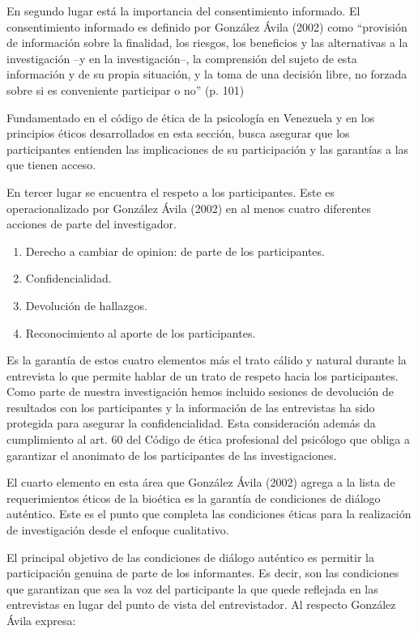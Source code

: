 En segundo lugar está la importancia del consentimiento informado.
El consentimiento informado es definido por González Ávila (2002) como
“provisión de información sobre la finalidad, los riesgos, los beneficios y
las alternativas a la investigación –y en la investigación–, la comprensión
del sujeto de esta información y de su propia situación, y la toma de una
decisión libre, no forzada sobre si es conveniente participar o no” (p. 101)

Fundamentado en el código de ética de la psicología en Venezuela y en los
principios éticos desarrollados en esta sección, busca asegurar que los
participantes entienden las implicaciones de su participación y las garantías
a las que tienen acceso.

En tercer lugar se encuentra el respeto a los participantes.
Este es operacionalizado por González Ávila (2002) en al menos cuatro
diferentes acciones de parte del investigador.

\begin{enumerate}
    \item Derecho a cambiar de opinion: de parte de los participantes.
    \item Confidencialidad.
    \item Devolución de hallazgos.
    \item Reconocimiento al aporte de los participantes.
\end{enumerate}

Es la garantía de estos cuatro elementos más el trato cálido y natural
durante la entrevista lo que permite hablar de un trato de respeto hacia los
participantes.
Como parte de nuestra investigación hemos incluido sesiones de devolución de
resultados con los participantes y la información de las entrevistas ha sido
protegida para asegurar la confidencialidad.
Esta consideración además da cumplimiento al art. 60 del Código de ética
profesional del psicólogo que obliga a garantizar el anonimato de los
participantes de las investigaciones.

El cuarto elemento en esta área que González Ávila
(2002) agrega a la lista de requerimientos éticos de la bioética es la
garantía de condiciones de diálogo auténtico.
Este es el punto que completa las condiciones éticas para la realización de
investigación desde el enfoque cualitativo.

El principal objetivo de las condiciones de diálogo auténtico es permitir la
participación genuina de parte de los informantes.
Es decir, son las condiciones que garantizan que sea la voz del participante
la que quede reflejada en las entrevistas en lugar del punto de vista del
entrevistador.
Al respecto González Ávila expresa:

